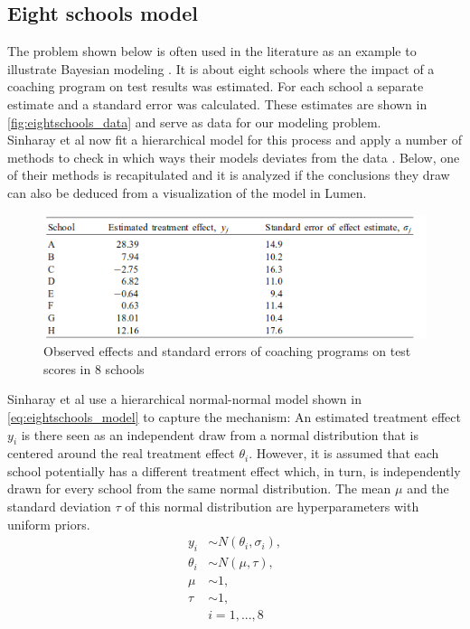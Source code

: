\documentclass{article}
\begin{document}
\subsection{Eight schools model}
\label{subsec:eight_schools}
The problem shown below is often used in the literature as an example to illustrate Bayesian modeling \cite{1439840954}\cite{sinharay2003posterior}\cite{rubin1981estimation}. It is about eight schools where the impact of a coaching program on test results was estimated. For each school a separate estimate and a standard error was calculated. These estimates are shown in \autoref{fig:eightschools_data} and serve as data for our modeling problem.\\ 
Sinharay et al now fit a hierarchical model for this process and apply a number of methods to check in which ways their models deviates from the data \cite{sinharay2003posterior}. Below, one of their methods is recapitulated and it is analyzed if the conclusions they draw can also be deduced from a visualization of the model in Lumen.
\begin{figure}
	\includegraphics[width=\textwidth]{images/eightschools_data.png}
	\caption[Observed effects and standard errors of coaching programs on test scores in 8 schools. Source: \cite{sinharay2003posterior}]{Observed effects and standard errors of coaching programs on test scores in 8 schools}
	\label{fig:eightschools_data}
\end{figure}
Sinharay et al use a hierarchical normal-normal model shown in \autoref{eq:eightschools_model} to capture the mechanism: An estimated treatment effect $y_i$ is there seen as an independent draw from a normal distribution that is centered around the real treatment effect $\theta_i$. However, it is assumed that each school potentially has a different treatment effect which, in turn, is independently drawn for every school from the same normal distribution. The mean $\mu$ and the standard deviation $\tau$ of this normal distribution are hyperparameters with uniform priors.
\begin{equation}
\label{eq:eightschools_model}
\begin{split}
y_i &\sim N(\theta_i,\sigma_i),\\
\theta_i &\sim N(\mu,\tau), \\
\mu &\sim 1, \\
\tau &\sim 1, \\
&i=1,...,8
\end{split}
\end{equation}
\end{document}
